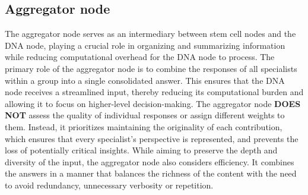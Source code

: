 \subsection{Aggregator node}
The aggregator node serves as an intermediary between stem cell nodes and the DNA node, playing a crucial role in organizing and summarizing information while reducing computational overhead for the DNA node to process. The primary role of the aggregator node is to combine the responses of all specialists within a group into a single consolidated answer. This ensures that the DNA node receives a streamlined input, thereby reducing its computational burden and allowing it to focus on higher-level decision-making. The aggregator node \textbf{DOES NOT} assess the quality of individual responses or assign different weights to them. Instead, it prioritizes maintaining the originality of each contribution, which ensures that every specialist’s perspective is represented, and prevents the loss of potentially critical insights. While aiming to preserve the depth and diversity of the input, the aggregator node also considers efficiency. It combines the answers in a manner that balances the richness of the content with the need to avoid redundancy, unnecessary verbosity or repetition.

